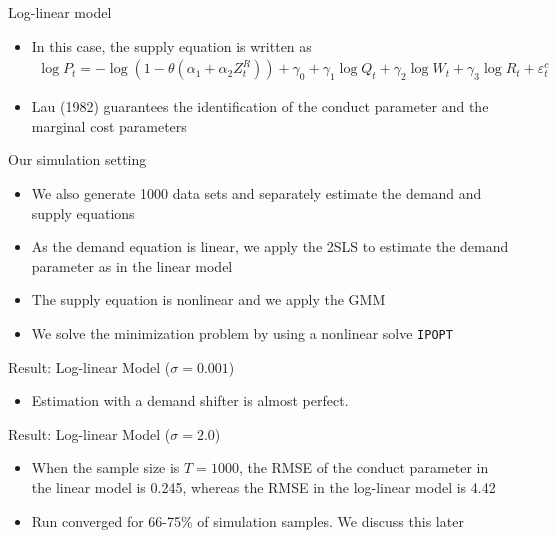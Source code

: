 \documentclass[aspectratio = 169]{beamer}
\theoremstyle{definition}
\begin{document}
\begin{frame}{Log-linear model}
    \begin{itemize}
        \item In this case, the supply equation is written as
        \begin{align}
            \log P_t = - \log(1 - \theta(\alpha_1 + \alpha_2 Z^{R}_{t})) + \gamma_0 + \gamma_1 \log Q_t +  \gamma_2 \log W_{t} + \gamma_3 \log R_t + \varepsilon^{c}_{t}
        \end{align}
        \item Lau (1982) guarantees the identification of the conduct parameter and the marginal cost parameters
    \end{itemize}
\end{frame}

\begin{frame}{Our simulation setting}
    \begin{itemize}
        \item We also generate 1000 data sets and separately estimate the demand and supply equations
        \item As the demand equation is linear, we apply the 2SLS to estimate the demand parameter as in the linear model
        \item The supply equation is nonlinear and we apply the GMM
        \item We solve the minimization problem by using a nonlinear solve \texttt{IPOPT}
    \end{itemize}
\end{frame}


\begin{frame}{Result: Log-linear Model ($\sigma = 0.001$)}
        \begin{table}[]
        \centering
        \tiny
        \label{tab:loglinear_with_demand_001}
    \end{table}
    \begin{itemize}
        \item Estimation with a demand shifter is almost perfect.
    \end{itemize}
\end{frame}


\begin{frame}{Result: Log-linear Model ($\sigma = 2.0$)}
        \begin{table}[]
        \centering
        \tiny
        \label{tab:loglinear_with_demand_2}
    \end{table}
    \begin{itemize}
        \item When the sample size is $T = 1000$, the RMSE of the conduct parameter in the  linear model is 0.245, whereas the RMSE in the log-linear model is 4.42
        \item Run converged for 66-75\% of simulation samples. We discuss this later
    \end{itemize}
\end{frame}
\end{document}

